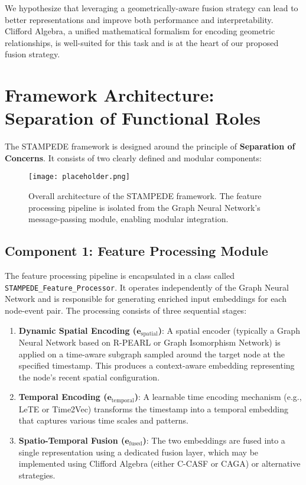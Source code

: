 \documentclass[11pt, a4paper]{article}
\begin{document}
We hypothesize that leveraging a geometrically-aware fusion strategy can lead to better representations and improve both performance and interpretability. Clifford Algebra, a unified mathematical formalism for encoding geometric relationships, is well-suited for this task and is at the heart of our proposed fusion strategy.

\section{Framework Architecture: Separation of Functional Roles}
The STAMPEDE framework is designed around the principle of \textbf{Separation of Concerns}. It consists of two clearly defined and modular components:

\begin{figure}[h!]
    \centering
    \texttt{[image: placeholder.png]}
    \caption{Overall architecture of the STAMPEDE framework. The feature processing pipeline is isolated from the Graph Neural Network's message-passing module, enabling modular integration.}
    \label{fig:architecture}
\end{figure}

\subsection{Component 1: Feature Processing Module}
The feature processing pipeline is encapsulated in a class called \texttt{STAMPEDE\_Feature\_Processor}. It operates independently of the Graph Neural Network and is responsible for generating enriched input embeddings for each node-event pair. The processing consists of three sequential stages:

\begin{enumerate}
    \item \textbf{Dynamic Spatial Encoding ($\mathbf{e}_{\text{spatial}}$)}: A spatial encoder (typically a Graph Neural Network based on R-PEARL or Graph Isomorphism Network) is applied on a time-aware subgraph sampled around the target node at the specified timestamp. This produces a context-aware embedding representing the node’s recent spatial configuration.

    \item \textbf{Temporal Encoding ($\mathbf{e}_{\text{temporal}}$)}: A learnable time encoding mechanism (e.g., LeTE or Time2Vec) transforms the timestamp into a temporal embedding that captures various time scales and patterns.

    \item \textbf{Spatio-Temporal Fusion ($\mathbf{e}_{\text{fused}}$)}: The two embeddings are fused into a single representation using a dedicated fusion layer, which may be implemented using Clifford Algebra (either C-CASF or CAGA) or alternative strategies.
\end{enumerate}
\end{document}
